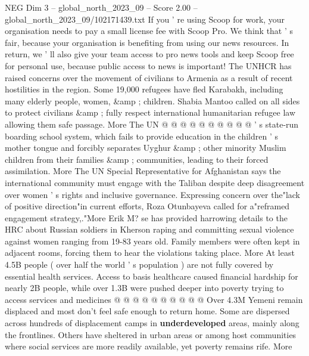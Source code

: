 \begin{textsample}{NEG Dim 3 – global\_north\_2023\_09 – Score 2.00 – global\_north\_2023\_09/102171439.txt}
If you ' re using Scoop for work, your organisation needs to pay a small license fee with Scoop Pro.
We think that ' s fair, because your organisation is benefiting from using our news resources.
In return, we ' ll also give your team access to pro news tools and keep Scoop free for personal use, because public access to news is important!
The UNHCR has raised concerns over the movement of civilians to Armenia as a result of recent hostilities in the region.
Some 19,000 refugees have fled Karabakh, including many elderly people, women, \&amp ; children.
Shabia Mantoo called on all sides to protect civilians \&amp ; fully respect international humanitarian refugee law allowing them safe passage.
More The UN @ @ @ @ @ @ @ @ @ @ ' s state-run boarding school system, which fails to provide education in the children ' s mother tongue and forcibly separates Uyghur \&amp ; other minority Muslim children from their families \&amp ; communities, leading to their forced assimilation.
More The UN Special Representative for Afghanistan says the international community must engage with the Taliban despite deep disagreement over women ' s rights and inclusive governance.
Expressing concern over the"lack of positive direction"in current efforts, Roza Otunbayeva called for a"reframed engagement strategy,."More Erik M? se has provided harrowing details to the HRC about Russian soldiers in Kherson raping and committing sexual violence against women ranging from 19-83 years old.
Family members were often kept in adjacent rooms, forcing them to hear the violations taking place.
More At least 4.5B people ( over half the world ' s population ) are not fully covered by essential health services.
Access to basis healthcare caused financial hardship for nearly 2B people, while over 1.3B were pushed deeper into poverty trying to access services and medicines @ @ @ @ @ @ @ @ @ @ Over 4.3M Yemeni remain displaced and most don't feel safe enough to return home.
Some are dispersed across hundreds of displacement camps in \textbf{underdeveloped} areas, mainly along the frontlines.
Others have sheltered in urban areas or among host communities where social services are more readily available, yet poverty remains rife.
More

\end{textsample}
